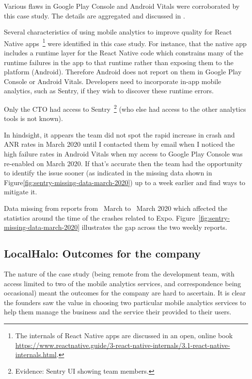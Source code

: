Various flaws in Google Play Console and Android Vitals were corroborated by this case study. The details are aggregated and discussed in .

Several characteristics of using mobile analytics to improve quality for React Native apps~\footnote{The internals of React Native apps are discussed in an open, online book \url{https://www.reactnative.guide/3-react-native-internals/3.1-react-native-internals.html}.} 
were identified in this case study. For instance, that the native app includes a runtime layer for the React Native code which constrains many of the runtime failures in the app to that runtime rather than exposing them to the platform (Android). Therefore Android does not report on them in Google Play Console or Android Vitals. Developers need to incorporate in-app mobile analytics, such as Sentry, if they wish to discover these runtime errors.

Only the CTO had access to Sentry~\footnote{Evidence: Sentry UI showing team members.} (who else had access to the other analytics tools is not known).

In hindsight, it appears the team did not spot the rapid increase in crash and ANR rates in March 2020 until I contacted them by email when I noticed the high failure rates in Android Vitals when my access to Google Play Console was re-enabled on  March 2020. If that's accurate then the team had the opportunity to identify the issue sooner (as indicated in the missing data shown in Figure\ref{fig:sentry-missing-data-march-2020}) up to a week earlier and find ways to mitigate it. 

Data missing from reports from~ March to~ March 2020 which affected the statistics around the time of the crashes related to Expo. Figure~\ref{fig:sentry-missing-data-march-2020} illustrates the gap across the two weekly reports. 


\subsection{LocalHalo: Outcomes for the company}
The nature of the case study (being remote from the development team, with access limited to two of the mobile analytics services, and correspondence being occasional) meant the outcomes for the company are hard to ascertain. It is clear the founders saw the value in choosing two particular mobile analytics services to help them manage the business and the service their provided to their users. 

